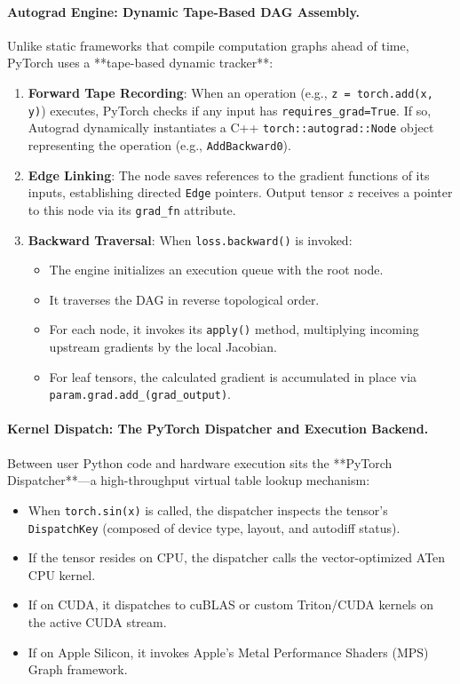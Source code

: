 \documentclass[11pt,a4paper]{article}
\begin{document}
\paragraph{Autograd Engine: Dynamic Tape-Based DAG Assembly.}
Unlike static frameworks that compile computation graphs ahead of time, PyTorch uses a **tape-based dynamic tracker**:

\begin{enumerate}
    \item \textbf{Forward Tape Recording}:
    When an operation (e.g., \texttt{z = torch.add(x, y)}) executes, PyTorch checks if any input has \texttt{requires\_grad=True}. If so, Autograd dynamically instantiates a C++ \texttt{torch::autograd::Node} object representing the operation (e.g., \texttt{AddBackward0}).
    \item \textbf{Edge Linking}:
    The node saves references to the gradient functions of its inputs, establishing directed \texttt{Edge} pointers. Output tensor $z$ receives a pointer to this node via its \texttt{grad\_fn} attribute.
    \item \textbf{Backward Traversal}:
    When \texttt{loss.backward()} is invoked:
    \begin{itemize}
        \item The engine initializes an execution queue with the root node.
        \item It traverses the DAG in reverse topological order.
        \item For each node, it invokes its \texttt{apply()} method, multiplying incoming upstream gradients by the local Jacobian.
        \item For leaf tensors, the calculated gradient is accumulated in place via \texttt{param.grad.add\_(grad\_output)}.
    \end{itemize}
\end{enumerate}

\paragraph{Kernel Dispatch: The PyTorch Dispatcher and Execution Backend.}
Between user Python code and hardware execution sits the **PyTorch Dispatcher**---a high-throughput virtual table lookup mechanism:

\begin{itemize}
    \item When \texttt{torch.sin(x)} is called, the dispatcher inspects the tensor's \texttt{DispatchKey} (composed of device type, layout, and autodiff status).
    \item If the tensor resides on CPU, the dispatcher calls the vector-optimized ATen CPU kernel.
    \item If on CUDA, it dispatches to cuBLAS or custom Triton/CUDA kernels on the active CUDA stream.
    \item If on Apple Silicon, it invokes Apple's Metal Performance Shaders (MPS) Graph framework.
\end{itemize}
\end{document}
